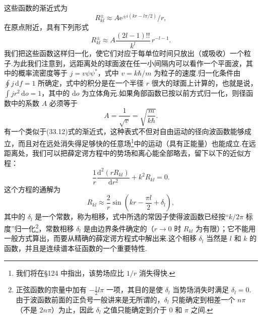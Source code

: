 这些函数的渐近式为
\begin{equation}
  R^{\pm}_{kl}\approx A\mathrm{e}^{\pm i(kr-l\pi/2)}/r,
\end{equation}
在原点附近，具有下列形式
\begin{equation}
  R^{\pm}_{kl}\approx A\frac{(2l-1)!!}{k^l}\,r^{-l-1}.
\end{equation}
我们把这些函数这样归一化，使它们对应于每单位时间只放出（或吸收）一个粒子.为此我们注意到，远距离处的球面波在任一小间隔内可以看作一个平面波，其中的概率流密度等于 $j=v\psi\psi^*$，式中 $v=k\hbar/m$ 为粒子的速度.归一化条件由 $\oint j\,\mathrm{d}f=1$ 所确定，式中的积分是在一个半径 $r$ 很大的球面上计算的，也就是说，$\int jr^2\,\mathrm{d}o=1$，其中的 $\mathrm{d}o$ 为立体角元.如果角部函数已按以前方式归一化，则径函数中的系数 $A$ 必须等于
\begin{equation}
  A=\frac{1}{\sqrt{v}}=\sqrt{\frac{m}{k\hbar}}.
\end{equation}
有一个类似于(33.12)式的渐近式，这种表式不但对自由运动的径向波函数能够成立，而且对在远处消失得足够快的任意场\footnote{我们将在§124 中指出，该势场应比 $1/r$ 消失得快.}中的运动（具有正能量）也能成立.在远距离处，我们可以把薛定谔方程中的势场和离心能全部略去，留下以下的近似方程：
\begin{equation*}
  \frac{1}{r}\frac{\mathrm{d}^2(rR_{kl})}{\mathrm{d}r^2}+k^2R_{kl}=0.
\end{equation*}
这个方程的通解为
\begin{equation}
  R_{kl}\approx\frac{2}{r}\sin\left(kr-\frac{\pi l}{2}+\delta_l\right),
\end{equation}
其中的 $\delta_l$ 是一个常数，称为相移，式中所选的常因子使得波函数已经按“$k/2\pi$ 标度”归一化\footnote{正弦函数的宗量中加有 $-\frac{1}{2}l\pi$ 一项，其目的是使 $\delta_l$ 当势场消失时满足 $\delta_l=0$. 由于波函数前面的正负号一般讲来是无所谓的，$\delta_l$ 只能确定到相差一个 $n\pi$（不是 $2n\pi$）为止，因此 $\delta_l$ 之值只能确定到介于 $0$ 和 $\pi$ 之间.}，常数相移 $\delta_l$ 是由边界条件确定的（$r\to0$ 时 $R_{kl}$ 为有限）；它不能用一般方式算出，而要从精确的薛定谔方程式中解出来.这个相移 $\delta_l$ 当然是 $l$ 和 $k$ 的函数，并且是连续谱本征函数的一个重要特性.

